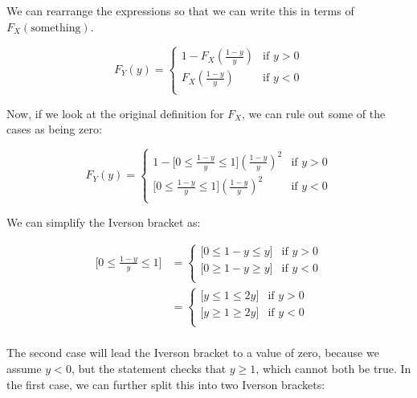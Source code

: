 \documentclass{article}
\begin{document}
We can rearrange the expressions so that we can write this in terms of
$F_X(\text{something})$.

\[
F_Y(y)=\begin{cases}
1-F_X\left(\frac{1-y}{y}\right) &\text{if $y>0$} \\
F_X\left(\frac{1-y}{y}\right) &\text{if $y<0$} \\
\end{cases}
\]

Now, if we look at the original definition for $F_X$, we can rule out
some of the cases as being zero:

\[
F_Y(y)=\begin{cases}
1-\lbrack0\le \frac{1-y}{y}\le 1\rbrack \left(\frac{1-y}{y}\right)^2  &\text{if $y>0$} \\
\lbrack0\le \frac{1-y}{y}\le 1\rbrack \left(\frac{1-y}{y}\right)^2 &\text{if $y<0$} \\
\end{cases}
\]

We can simplify the Iverson bracket as:

\[
\begin{array}{rl}
\lbrack 0\le \frac{1-y}{y}\le 1\rbrack &= \begin{cases}
\lbrack 0\le 1-y \le y\rbrack &\text{if $y>0$} \\
\lbrack 0\ge 1-y \ge y\rbrack &\text{if $y<0$} \\
\end{cases} \\

&=\begin{cases}
\lbrack y\le 1 \le 2y\rbrack &\text{if $y>0$} \\
\lbrack y\ge 1 \ge 2y\rbrack &\text{if $y<0$} \\
\end{cases} \\
\end{array}
\]

The second case will lead the Iverson bracket to a value of zero,
because we assume $y<0$, but the statement checks that $y\ge1$, which
cannot both be true. In the first case, we can further split this into
two Iverson brackets:
\end{document}
